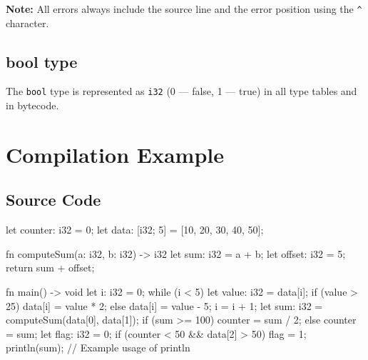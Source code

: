 \documentclass[a4paper,12pt]{article}
\begin{document}
    \textbf{Note:} All errors always include the source line and the error position using the \texttt{^} character.

    \subsection*{bool type}
    The \texttt{bool} type is represented as \texttt{i32} (0 --- false, 1 --- true) in all type tables and in bytecode.

    \section{Compilation Example}
    \subsection{Source Code}
    \begin{snailcode}
        let counter: i32 = 0;
  let data: [i32; 5] = [10, 20, 30, 40, 50];

  fn computeSum(a: i32, b: i32) -> i32 {
  let sum: i32 = a + b;
  let offset: i32 = 5;
  return sum + offset;
  }

  fn main() -> void {
  let i: i32 = 0;
  while (i < 5) {
  let value: i32 = data[i];
  if (value > 25) {
  data[i] = value * 2;
  } else {
  data[i] = value - 5;
  }
  i = i + 1;
  }
  let sum: i32 = computeSum(data[0], data[1]);
  if (sum >= 100) {
  counter = sum / 2;
  } else {
  counter = sum;
  }
  let flag: i32 = 0;
  if (counter < 50 && data[2] > 50) {
  flag = 1;
  }
  println(sum); // Example usage of println
  }
    \end{snailcode}
\end{document}
